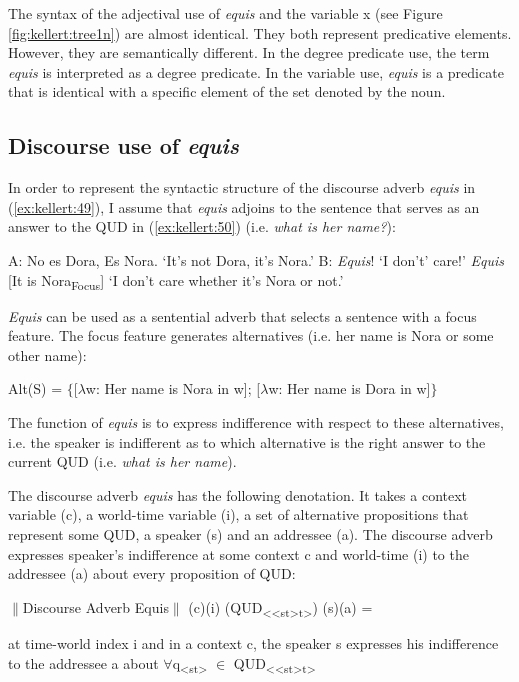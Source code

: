 \documentclass[output=paper]{langsci/langscibook}
\begin{document}
The syntax of the adjectival use of \textit{equis} and the variable x (see Figure \ref{fig:kellert:tree1n}) are almost identical. They both represent predicative elements. However, they are semantically different. In the degree predicate use, the term \textit{equis} is interpreted as a degree predicate. In the variable use, \textit{equis} is a predicate that is identical with a specific element of the set denoted by the noun.


\subsection{Discourse use of \textit{equis}}\label{sec:kellert:3.4}
In order to represent the syntactic structure of the discourse adverb \textit{equis} in (\ref{ex:kellert:49}), I assume that \textit{equis} adjoins to the sentence that serves as an answer to the QUD in (\ref{ex:kellert:50}) (i.e. \textit{what is her name?}):

\ea\label{ex:kellert:49} A: No es Dora, Es Nora. `It’s not Dora, it’s Nora.' B: \textit{Equis}! ‘I don’t’ care!’
\ex  \textit{Equis} {[}It is Nora\textsubscript{Focus}{]} ‘I don’t care whether it’s Nora or not.’
\z

\textit{Equis} can be used as a sentential adverb that selects a sentence with a focus feature. The focus feature generates alternatives (i.e. her name is Nora or some other name):

\ea\label{ex:kellert:51} Alt(S) = $\lbrace${[}$\lambda$w: Her name is Nora in w{]}; {[}$\lambda$w: Her name is Dora in w{]}$\rbrace$
\z

The function of \textit{equis} is to express indifference with respect to these alternatives, i.e. the speaker is indifferent as to which alternative is the right answer to the current QUD (i.e. \textit{what is her name}).

The discourse adverb \textit{equis} has the following denotation. It takes a context variable (c), a world-time variable (i), a set of alternative propositions that represent some QUD, a speaker (s) and an addressee (a). The discourse adverb expresses speaker’s indifference at some context c and world-time (i) to the addressee (a) about every proposition of QUD:

\ea\label{ex:kellert:52} $\parallel$Discourse Adverb Equis$\parallel$ (c)(i) (QUD\textsubscript{{<}{<}st>t>}) (s)(a) =\par at time-world index i and in a context c, the speaker s expresses his indifference to the addressee a about $\forall$q\textsubscript{<st>} $\in$ QUD\textsubscript{{<}{<}st>t>}
\z
\end{document}
